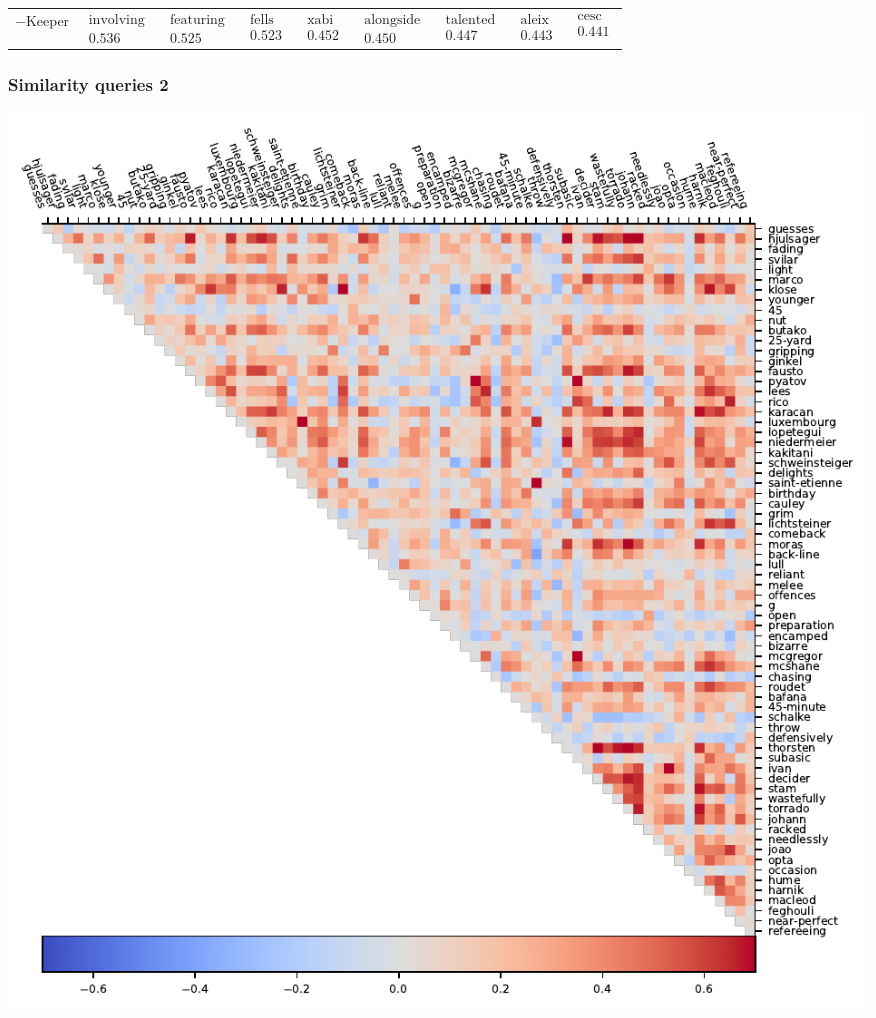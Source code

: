 \documentclass{beamer}
\begin{document}
\begin{frame}
\begin{tabular}{r|c c c c c c c c}
\\\hline
$-$Keeper
& $ \begin{matrix} \text{involving} \\ 0.536 \end{matrix}$
& $ \begin{matrix} \text{featuring} \\ 0.525 \end{matrix}$
& $ \begin{matrix} \text{fells} \\ 0.523 \end{matrix}$
& $ \begin{matrix} \text{xabi} \\ 0.452 \end{matrix}$
& $ \begin{matrix} \text{alongside} \\ 0.450 \end{matrix}$
& $ \begin{matrix} \text{talented} \\ 0.447 \end{matrix}$
& $ \begin{matrix} \text{aleix} \\ 0.443 \end{matrix}$
& $ \begin{matrix} \text{cesc} \\ 0.441 \end{matrix}$
 \end{tabular}
 \end{frame}

\begin{frame}
\frametitle{Similarity queries 2}
\includegraphics[width=.75\textwidth]{figures/similarity_matrix.pdf}
\end{frame}
\end{document}
